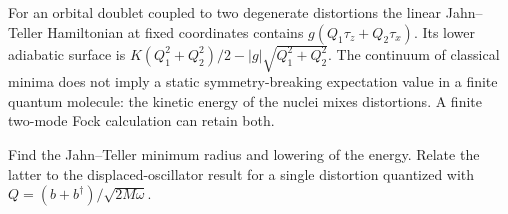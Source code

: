 For an orbital doublet coupled to two degenerate distortions the
linear Jahn--Teller Hamiltonian at fixed coordinates contains
$g(Q_1\tau_z+Q_2\tau_x)$. Its lower adiabatic surface is
$K(Q_1^2+Q_2^2)/2-|g|\sqrt{Q_1^2+Q_2^2}$. The continuum of classical
minima does not imply a static symmetry-breaking expectation value in
a finite quantum molecule: the kinetic energy of the nuclei mixes
distortions. A finite two-mode Fock calculation can retain both.
\begin{exercise}\label{ex:jt}
Find the Jahn--Teller minimum radius and lowering of the energy.
Relate the latter to the displaced-oscillator result for a single
distortion quantized with $Q=(b+b^\dagger)/\sqrt{2M\omega}$.
\end{exercise}
